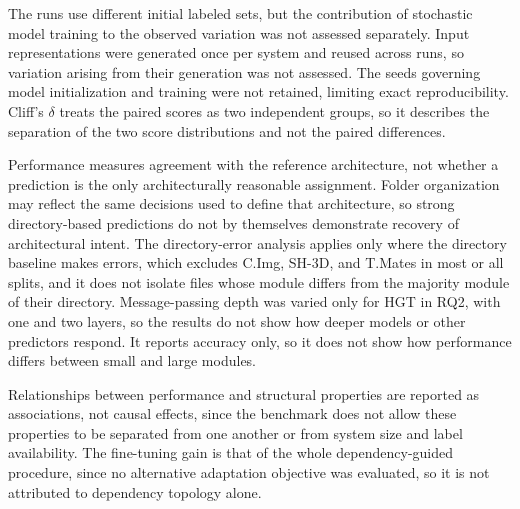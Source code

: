 The runs use different initial labeled sets, but the contribution of stochastic model training to the observed variation was not assessed separately. Input representations were generated once per system and reused across runs, so variation arising from their generation was not assessed. The seeds governing model initialization and training were not retained, limiting exact reproducibility. Cliff's $\delta$ treats the paired scores as two independent groups, so it describes the separation of the two score distributions and not the paired differences.

 Performance measures agreement with the reference architecture, not whether a prediction is the only architecturally reasonable assignment. Folder organization may reflect the same decisions used to define that architecture, so strong directory-based predictions do not by themselves demonstrate recovery of architectural intent. The directory-error analysis applies only where the directory baseline makes errors, which excludes C.Img, SH-3D, and T.Mates in most or all splits, and it does not isolate files whose module differs from the majority module of their directory.
Message-passing depth was varied only for HGT in RQ2, with one and two layers, so the results do not show how deeper models or other predictors respond. It reports accuracy only, so it does not show how performance differs between small and large modules.

Relationships between performance and structural properties are reported as associations, not causal effects, since the benchmark does not allow these properties to be separated from one another or from system size and label availability. The fine-tuning gain is that of the whole dependency-guided procedure, since no alternative adaptation objective was evaluated, so it is not attributed to dependency topology alone.
